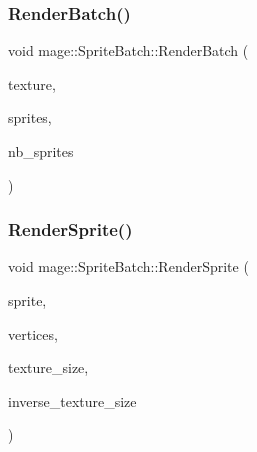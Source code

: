 \hypertarget{classmage_1_1_sprite_batch_a37356dc0119bcc4237ca9d05a40628e7}{}\label{classmage_1_1_sprite_batch_a37356dc0119bcc4237ca9d05a40628e7} 
\subsubsection{\texorpdfstring{Render\+Batch()}{RenderBatch()}}
{\footnotesize\ttfamily void mage\+::\+Sprite\+Batch\+::\+Render\+Batch (\begin{DoxyParamCaption}\item[{I\+D3\+D11\+Shader\+Resource\+View $\ast$}]{texture,  }\item[{const Sprite\+Info $\ast$const $\ast$}]{sprites,  }\item[{size\+\_\+t}]{nb\+\_\+sprites }\end{DoxyParamCaption})\hspace{0.3cm}{\ttfamily [private]}}

\hypertarget{classmage_1_1_sprite_batch_a97d810daa9bef4d5d5ec2210db6ad26f}{}\label{classmage_1_1_sprite_batch_a97d810daa9bef4d5d5ec2210db6ad26f} 
\subsubsection{\texorpdfstring{Render\+Sprite()}{RenderSprite()}}
{\footnotesize\ttfamily void mage\+::\+Sprite\+Batch\+::\+Render\+Sprite (\begin{DoxyParamCaption}\item[{const Sprite\+Info $\ast$}]{sprite,  }\item[{\hyperlink{structmage_1_1_vertex_position_color_texture}{Vertex\+Position\+Color\+Texture} $\ast$}]{vertices,  }\item[{const X\+M\+V\+E\+C\+T\+OR \&}]{texture\+\_\+size,  }\item[{const X\+M\+V\+E\+C\+T\+OR \&}]{inverse\+\_\+texture\+\_\+size }\end{DoxyParamCaption})\hspace{0.3cm}{\ttfamily [private]}}

\hypertarget{classmage_1_1_sprite_batch_a61ab7462374d9190220629be7827ba4b}{}\label{classmage_1_1_sprite_batch_a61ab7462374d9190220629be7827ba4b} 
